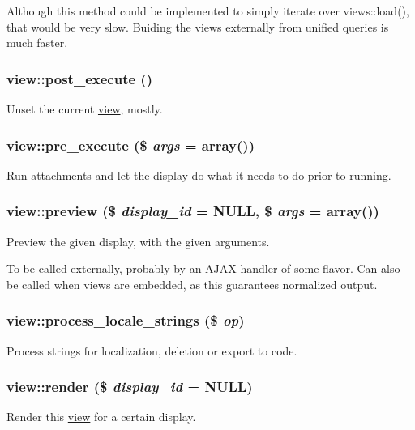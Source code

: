 Although this method could be implemented to simply iterate over views::load(), that would be very slow. Buiding the views externally from unified queries is much faster. \hypertarget{classview_ac541f5588453cd52ce0b5c0e0b3443f4}{
\subsubsection[{post\_\-execute}]{\setlength{\rightskip}{0pt plus 5cm}view::post\_\-execute ()}}
\label{classview_ac541f5588453cd52ce0b5c0e0b3443f4}
Unset the current \hyperlink{classview}{view}, mostly. \hypertarget{classview_ab3b5984d0d4628552580a2703502f840}{
\subsubsection[{pre\_\-execute}]{\setlength{\rightskip}{0pt plus 5cm}view::pre\_\-execute (\$ {\em args} = {\ttfamily array()})}}
\label{classview_ab3b5984d0d4628552580a2703502f840}
Run attachments and let the display do what it needs to do prior to running. \hypertarget{classview_ae279461b2f1636e802587901acdf3bd2}{
\subsubsection[{preview}]{\setlength{\rightskip}{0pt plus 5cm}view::preview (\$ {\em display\_\-id} = {\ttfamily NULL}, \/  \$ {\em args} = {\ttfamily array()})}}
\label{classview_ae279461b2f1636e802587901acdf3bd2}
Preview the given display, with the given arguments.

To be called externally, probably by an AJAX handler of some flavor. Can also be called when views are embedded, as this guarantees normalized output. \hypertarget{classview_ab0ffcc535f57804df9a47585b30b3207}{
\subsubsection[{process\_\-locale\_\-strings}]{\setlength{\rightskip}{0pt plus 5cm}view::process\_\-locale\_\-strings (\$ {\em op})}}
\label{classview_ab0ffcc535f57804df9a47585b30b3207}
Process strings for localization, deletion or export to code. \hypertarget{classview_ab5ab302afd30f1c6805dc82883a5fdd4}{
\subsubsection[{render}]{\setlength{\rightskip}{0pt plus 5cm}view::render (\$ {\em display\_\-id} = {\ttfamily NULL})}}
\label{classview_ab5ab302afd30f1c6805dc82883a5fdd4}
Render this \hyperlink{classview}{view} for a certain display.

